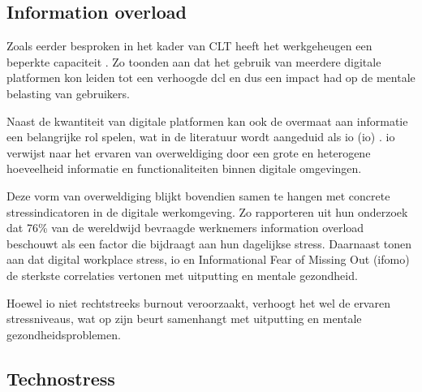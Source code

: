 \vspace{1em}

\subsection{Information overload}
\label{subsec:info-overload}

\vspace{1em}

Zoals eerder besproken in het kader van CLT heeft het werkgeheugen een beperkte capaciteit \autocite{Ibrahim2025}. Zo toonden \textcite{Ibrahim2025} aan dat het gebruik van meerdere digitale platformen kon leiden tot een verhoogde \acrshort{dcl} en dus een impact had op de mentale belasting van gebruikers.

\vspace{1em}

Naast de kwantiteit van digitale platformen kan ook de overmaat aan informatie een belangrijke rol spelen, wat in de literatuur wordt aangeduid als \acrlong{io} (\acrshort{io}) \autocite{Schmitt2021}. \acrshort{io} verwijst naar het ervaren van overweldiging door een grote en heterogene hoeveelheid informatie en functionaliteiten binnen digitale omgevingen.

\vspace{1em}

Deze vorm van overweldiging blijkt bovendien samen te hangen met concrete stressindicatoren in de digitale werkomgeving. Zo rapporteren \textcite{Marsh2024} uit hun onderzoek dat 76\% van de wereldwijd bevraagde werknemers information overload beschouwt als een factor die bijdraagt aan hun dagelijkse stress. Daarnaast tonen \textcite{Marsh2024} aan dat digital workplace stress, \acrlong{io} en Informational Fear of Missing Out (\acrshort{ifomo}) de sterkste correlaties vertonen met uitputting en mentale gezondheid. 

\newpage

Hoewel \acrlong{io} niet rechtstreeks burnout veroorzaakt, verhoogt het wel de ervaren stressniveaus, wat op zijn beurt samenhangt met uitputting en mentale gezondheidsproblemen.

\vspace{1em}

\subsection{Technostress}
\label{subsec:technostress}

\vspace{1em}

